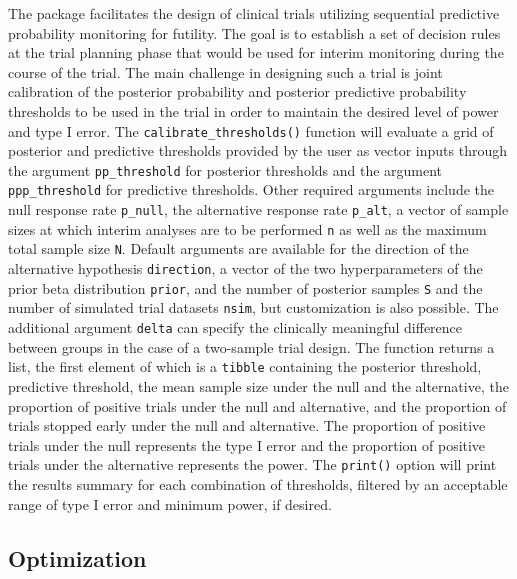 The  package facilitates the design of clinical trials
utilizing sequential predictive probability monitoring for futility. The
goal is to establish a set of decision rules at the trial planning phase
that would be used for interim monitoring during the course of the
trial. The main challenge in designing such a trial is joint calibration
of the posterior probability and posterior predictive probability
thresholds to be used in the trial in order to maintain the desired
level of power and type I error. The \texttt{calibrate\_thresholds()}
function will evaluate a grid of posterior and predictive thresholds
provided by the user as vector inputs through the argument
\texttt{pp\_threshold} for posterior thresholds and the argument
\texttt{ppp\_threshold} for predictive thresholds. Other required
arguments include the null response rate \texttt{p\_null}, the
alternative response rate \texttt{p\_alt}, a vector of sample sizes at
which interim analyses are to be performed \texttt{n} as well as the
maximum total sample size \texttt{N}. Default arguments are available
for the direction of the alternative hypothesis \texttt{direction}, a
vector of the two hyperparameters of the prior beta distribution
\texttt{prior}, and the number of posterior samples \texttt{S} and the
number of simulated trial datasets \texttt{nsim}, but customization is
also possible. The additional argument \texttt{delta} can specify the
clinically meaningful difference between groups in the case of a
two-sample trial design. The function returns a list, the first element
of which is a \texttt{tibble} containing the posterior threshold,
predictive threshold, the mean sample size under the null and the
alternative, the proportion of positive trials under the null and
alternative, and the proportion of trials stopped early under the null
and alternative. The proportion of positive trials under the null
represents the type I error and the proportion of positive trials under
the alternative represents the power. The \texttt{print()} option will
print the results summary for each combination of thresholds, filtered
by an acceptable range of type I error and minimum power, if desired.

\hypertarget{optimization}{%
\subsection{Optimization}\label{optimization}}

